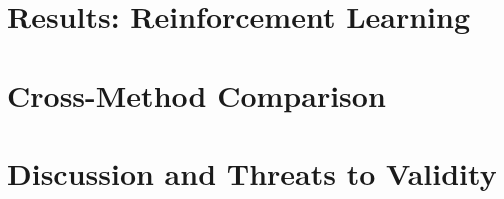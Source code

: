\section{Results: Reinforcement Learning}

\section{Cross-Method Comparison}

\section{Discussion and Threats to Validity}
